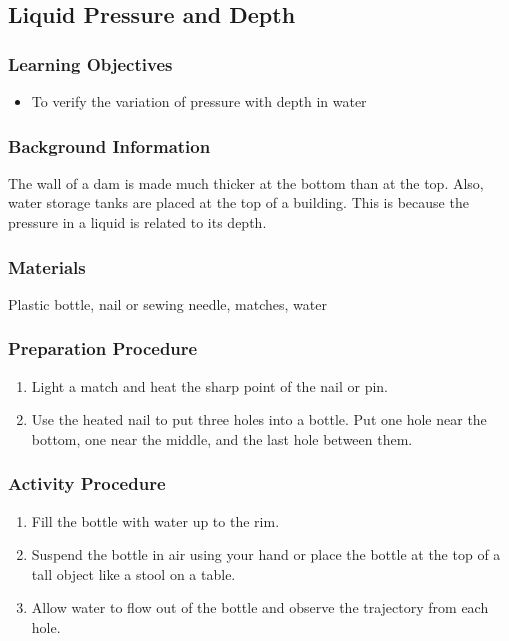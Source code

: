 \subsection{Liquid Pressure and Depth}

\subsubsection*{Learning Objectives}
\begin{itemize}
\item{To verify the variation of pressure with depth in water} 
\end{itemize}

\subsubsection*{Background Information}
The wall of a dam is made much thicker at the bottom than at the top.  Also, water storage tanks are placed at the top of a building.  This is because the pressure in a liquid is related to its depth.

\subsubsection*{Materials}
Plastic bottle, nail or sewing needle, matches, water


\subsubsection*{Preparation Procedure}
\begin{enumerate}
\item{Light a match and heat the sharp point of the nail or pin.} 
\item{Use the heated nail to put three holes into a bottle. Put one hole near the bottom, one near the middle, and the last hole between them.} 
\end{enumerate}

\subsubsection*{Activity Procedure}
\begin{enumerate}
\item{Fill the bottle with water up to the rim.} 
\item{Suspend the bottle in air using your hand or place the bottle at the top of a tall object like a stool on a table.} 
\item{Allow water to flow out of the bottle and observe the trajectory from each hole.} 
\end{enumerate}

